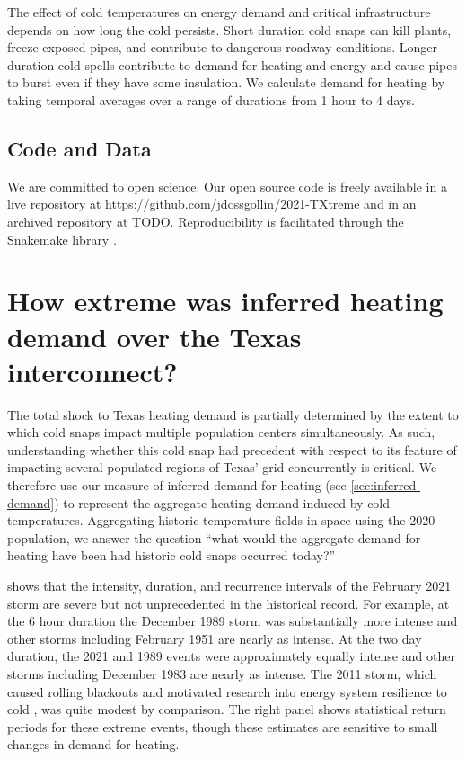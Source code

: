 \documentclass[12pt]{iopart}
\begin{document}
The effect of cold temperatures on energy demand and critical infrastructure depends on how long the cold persists.
Short duration cold snaps can kill plants, freeze exposed pipes, and contribute to dangerous roadway conditions.
Longer duration cold spells contribute to demand for heating and energy and cause pipes to burst even if they have some insulation.
We calculate demand for heating by taking temporal averages over a range of durations from 1 hour to 4 days.

\subsection{Code and Data}

We are committed to open science.
Our open source code is freely available in a live repository at \url{https://github.com/jdossgollin/2021-TXtreme} and in an archived repository at TODO.
Reproducibility is facilitated through the Snakemake library \cite{koster_snakemake:2012}.

\section{How extreme was inferred heating demand over the Texas interconnect?}

The total shock to Texas heating demand is partially determined by the extent to which cold snaps impact multiple population centers simultaneously.
As such, understanding whether this cold snap had precedent with respect to its feature of impacting several populated regions of Texas' grid concurrently is critical.
We therefore use our measure of inferred demand for heating (see \cref{sec:inferred-demand}) to represent the aggregate heating demand induced by cold temperatures.
Aggregating historic temperature fields in space using the 2020 population, we answer the question ``what would the aggregate demand for heating have been had historic cold snaps occurred today?''

 shows that the intensity, duration, and recurrence intervals of the February 2021 storm are severe but not unprecedented in the historical record.
For example, at the 6 hour duration the December 1989 storm was substantially more intense and other storms including February 1951 are nearly as intense.
At the two day duration, the 2021 and 1989 events were approximately equally intense and other storms including December 1983 are nearly as intense.
The 2011 storm, which caused rolling blackouts and motivated research into energy system resilience to cold \cite{ferc_outages:2011}, was quite modest by comparison.
The right panel shows statistical return periods for these extreme events, though these estimates are sensitive to small changes in demand for heating.
\end{document}
